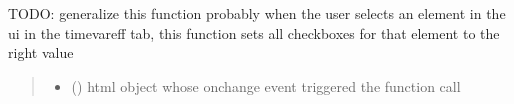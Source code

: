 \documentclass[letterpaper,10pt,english]{sphinxmanual}
\begin{document}

\begin{fulllineitems}
\label{\detokenize{docs_gui/js_api/urbs_editor/timevareff_editor:fillSelectedFeatureTimevareffEditor}}
\pysigstartsignatures
{}
\pysigstopsignatures
\sphinxAtStartPar
TODO: generalize this function probably
when the user selects an element in the ui in the timevareff tab, this function sets all checkboxes for that element to the right value
\begin{quote}\begin{description}
\begin{itemize}
\item {} 
\sphinxAtStartPar
{} () \textendash{} html object whose onchange event triggered the function call

\end{itemize}

\end{description}\end{quote}

\end{fulllineitems}

\end{document}
